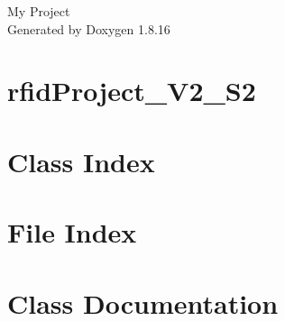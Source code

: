 \let\mypdfximage\pdfximage\def\pdfximage{\immediate\mypdfximage}\documentclass[twoside]{book}
\newcommand{\+}{\discretionary{\mbox{\scriptsize$\hookleftarrow$}}{}{}}
\newcommand{\clearemptydoublepage}{%
  \newpage{\pagestyle{empty}\cleardoublepage}%
}
\begin{document}
\hypersetup{pageanchor=false,
             bookmarksnumbered=true,
             pdfencoding=unicode
            }
\begin{titlepage}
\vspace*{7cm}
\begin{center}%
{\Large My Project }\\
\vspace*{1cm}
{\large Generated by Doxygen 1.8.16}\\
\end{center}
\end{titlepage}
\clearemptydoublepage
{}
\tableofcontents
\clearemptydoublepage
{}
\hypersetup{pageanchor=true}

\chapter{rfid\+Project\+\_\+\+V2\+\_\+\+S2}
\label{md__home_lance_eclipse-workspace_rfidProject_V2_S2_README}

\chapter{Class Index}

\chapter{File Index}

\chapter{Class Documentation}


















\end{document}
